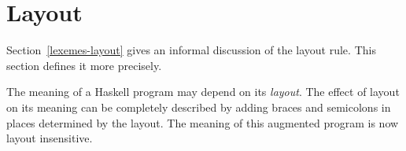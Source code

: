 %
%
%
%
%
%
%
%
%
%
%
%
%
%
%
%
%
%
%
%
%
%
%
%
%
%
%


\section{Layout}
\label{layout}

Section~\ref{lexemes-layout} gives an informal discussion of the layout
rule. This section defines it more precisely.

The meaning of a Haskell program may depend on its {\em layout}.
The effect of layout on its meaning can be completely described by adding
braces and semicolons in places determined by the layout.  The meaning of
this augmented program is now layout insensitive.

